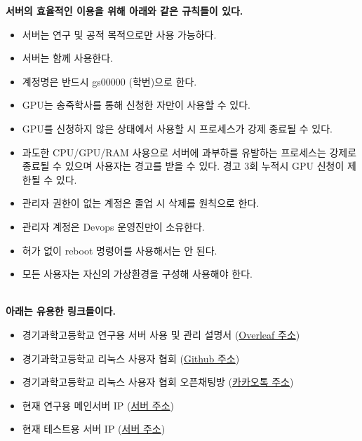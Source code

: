 \begin{acknowledgements}
\textbf{
서버의 효율적인 이용을 위해 아래와 같은 규칙들이 있다.}
~\\


\begin{itemize}
 \item 서버는 연구 및 공적 목적으로만 사용 가능하다.
 \item 서버는 함께 사용한다.
 \item 계정명은 반드시 gs00000 (학번)으로 한다.
 \item GPU는 송죽학사를 통해 신청한 자만이 사용할 수 있다.
 \item GPU를 신청하지 않은 상태에서 사용할 시 프로세스가 강제 종료될 수 있다.
 \item 과도한 CPU/GPU/RAM 사용으로 서버에 과부하를 유발하는 프로세스는 강제로 종료될 수 있으며 사용자는 경고를 받을 수 있다. 경고 3회 누적시 GPU 신청이 제한될 수 있다.
 \item 관리자 권한이 없는 계정은 졸업 시 삭제를 원칙으로 한다.
 \item 관리자 계정은 Devops 운영진만이 소유한다.
 \item 허가 없이 reboot 명령어를 사용해서는 안 된다.
 \item 모든 사용자는 자신의 가상환경을 구성해 사용해야 한다.
\end{itemize}~\\



\textbf{
아래는 유용한 링크들이다.}
~\\
\begin{itemize}
 \item 경기과학고등학교 연구용 서버 사용 및 관리 설명서 (\href{https://www.overleaf.com/project/60a1d2365a26a733e5a9b16f}{Overleaf 주소})
 \item 경기과학고등학교 리눅스 사용자 협회 (\href{https://github.com/gshslinuxintro}{Github 주소})
 \item 경기과학고등학교 리눅스 사용자 협회 오픈채팅방 (\href{https://open.kakao.com/o/go6dFeee}{카카오톡 주소})
 \item 현재 연구용 메인서버 IP (\href{http://115.23.235.150}{서버 주소})
 \item 현재 테스트용 서버 IP (\href{http://115.23.235.135}{서버 주소})
\end{itemize}~\\
\end{acknowledgements}